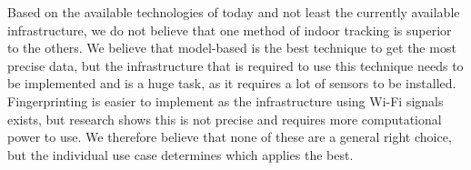 Based on the available technologies of today and not least the currently available infrastructure, we do not believe that one method of indoor tracking is superior to the others.
We believe that model-based is the best technique to get the most precise data, but the infrastructure that is required to use this technique needs to be implemented and is a huge task, as it requires a lot of sensors to be installed. 
Fingerprinting is easier to implement as the infrastructure using Wi-Fi signals exists, but research shows this is not precise and requires more computational power to use. 
We therefore believe that none of these are a general right choice, but the individual use case determines which applies the best.
